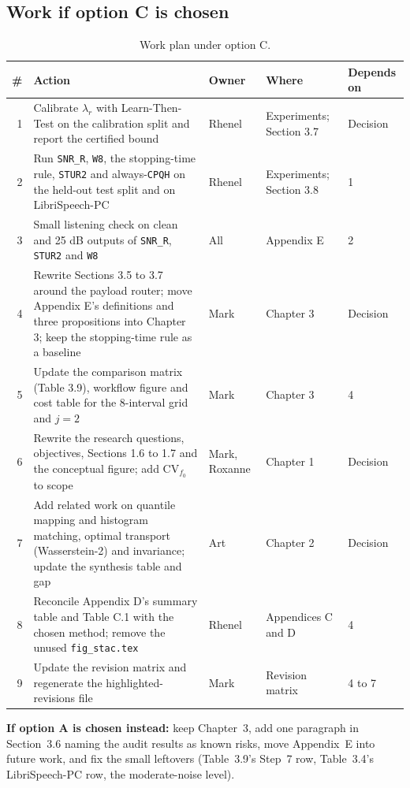 \documentclass[11pt,a4paper]{article}
\newcommand{\snrr}{\texttt{SNR\_R}}
\begin{document}
\subsection*{Work if option C is chosen}
\begin{table}[!htbp]
\centering\small
\caption{Work plan under option C.}
\label{tab:actions}
\begin{tabularx}{\textwidth}{@{}r L P{2.0cm} P{2.9cm} P{1.6cm}@{}}
\toprule
\textbf{\#} & \textbf{Action} & \textbf{Owner} & \textbf{Where} & \textbf{Depends on} \\
 & Calibrate $\lambda_r$ with Learn-Then-Test on the calibration split and report the certified bound & Rhenel & Experiments; Section 3.7 & Decision \\
2 & Run \snrr, \texttt{W8}, the stopping-time rule, \texttt{STUR2} and always-\texttt{CPQH} on the held-out test split and on LibriSpeech-PC & Rhenel & Experiments; Section 3.8 & 1 \\
3 & Small listening check on clean and 25 dB outputs of \snrr, \texttt{STUR2} and \texttt{W8} & All & Appendix E & 2 \\
4 & Rewrite Sections 3.5 to 3.7 around the payload router; move Appendix E's definitions and three propositions into Chapter 3; keep the stopping-time rule as a baseline & Mark & Chapter 3 & Decision \\
5 & Update the comparison matrix (Table 3.9), workflow figure and cost table for the 8-interval grid and $j=2$ & Mark & Chapter 3 & 4 \\
6 & Rewrite the research questions, objectives, Sections 1.6 to 1.7 and the conceptual figure; add $\mathrm{CV}_{f_0}$ to scope & Mark, Roxanne & Chapter 1 & Decision \\
7 & Add related work on quantile mapping and histogram matching, optimal transport (Wasserstein-2) and invariance; update the synthesis table and gap & Art & Chapter 2 & Decision \\
8 & Reconcile Appendix D's summary table and Table C.1 with the chosen method; remove the unused \texttt{fig\_stac.tex} & Rhenel & Appendices C and D & 4 \\
9 & Update the revision matrix and regenerate the highlighted-revisions file & Mark & Revision matrix & 4 to 7 \\
\bottomrule
\end{tabularx}
\end{table}

\textbf{If option A is chosen instead:} keep Chapter~3, add one paragraph in Section~3.6 naming the audit results as known risks, move Appendix~E into future work, and fix the small leftovers (Table~3.9's Step~7 row, Table~3.4's LibriSpeech-PC row, the moderate-noise level).
\end{document}
